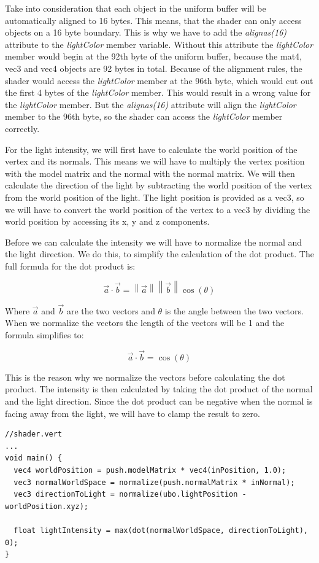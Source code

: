 \documentclass[12pt]{report} \usepackage{preamble}
\begin{document}
Take into consideration that each object in the uniform buffer will be automatically aligned to 16 bytes. This means, that
the shader can only access objects on a 16 byte boundary. This is why we have to add the \textit{alignas(16)} attribute to the \textit{lightColor} member variable.
Without this attribute the \textit{lightColor} member would begin at the 92th byte of the uniform buffer, because the mat4, vec3 and vec4 objects are 92 bytes in total.
Because of the alignment rules, the shader would access the \textit{lightColor} member at the 96th byte, which would cut out the first 4 bytes of the \textit{lightColor} member.
This would result in a wrong value for the \textit{lightColor} member.
But the \textit{alignas(16)} attribute will align the \textit{lightColor} member to the 96th byte, so the shader can access the \textit{lightColor} member correctly.

For the light intensity, we will first have to calculate the world position of the vertex and its normals.
This means we will have to multiply the vertex position with the model matrix and the normal with the normal matrix.
We will then calculate the direction of the light by subtracting the world position of the vertex from the world position of the light.
The light position is provided as a vec3, so we will have to convert the world position of the vertex to a vec3 by dividing the world position by accessing its x, y and z components.

Before we can calculate the intensity we will have to normalize the normal and the light direction. We do this, to simplify the calculation of the dot product.
The full formula for the dot product is:

\[
	\vec{a} \cdot \vec{b} = \left\| \vec{a} \right\| \left\| \vec{b} \right\| \cos(\theta)
\]

Where $\vec{a}$ and $\vec{b}$ are the two vectors and $\theta$ is the angle between the two vectors.
When we normalize the vectors the length of the vectors will be 1 and the formula simplifies to:

\[
	\vec{a} \cdot \vec{b} = \cos(\theta)
\]

This is the reason why we normalize the vectors before calculating the dot product.
The intensity is then calculated by taking the dot product of the normal and the light direction.
Since the dot product can be negative when the normal is facing away from the light, we will have to clamp the result to zero.

\begin{lstlisting}[Language=C++]
//shader.vert
...
void main() {
  vec4 worldPosition = push.modelMatrix * vec4(inPosition, 1.0);
  vec3 normalWorldSpace = normalize(push.normalMatrix * inNormal);
  vec3 directionToLight = normalize(ubo.lightPosition - worldPosition.xyz);

  float lightIntensity = max(dot(normalWorldSpace, directionToLight), 0);
}
\end{lstlisting}
\end{document}

